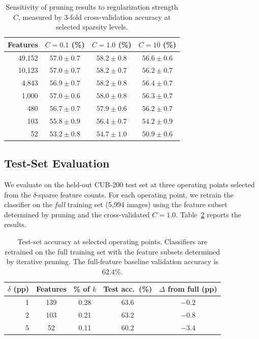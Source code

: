 \begin{table}[t]
\centering
\caption{Sensitivity of pruning results to regularization strength $C$, measured by 3-fold cross-validation accuracy at selected sparsity levels.}
\label{tab:sensitivity}
\begin{tabular}{r ccc}
\toprule
Features & $C = 0.1$ (\%) & $C = 1.0$ (\%) & $C = 10$ (\%) \\
\midrule
49{,}152 & $57.0 \pm 0.7$ & $\mathbf{58.2 \pm 0.8}$ & $56.6 \pm 0.6$ \\
10{,}123 & $57.0 \pm 0.7$ & $\mathbf{58.2 \pm 0.7}$ & $56.2 \pm 0.7$ \\
4{,}843  & $56.9 \pm 0.7$ & $\mathbf{58.2 \pm 0.8}$ & $56.4 \pm 0.7$ \\
1{,}000  & $57.0 \pm 0.6$ & $\mathbf{58.0 \pm 0.8}$ & $56.3 \pm 0.7$ \\
480      & $56.7 \pm 0.7$ & $\mathbf{57.9 \pm 0.6}$ & $56.2 \pm 0.7$ \\
103      & $55.8 \pm 0.9$ & $\mathbf{56.4 \pm 0.7}$ & $54.2 \pm 0.9$ \\
52       & $53.2 \pm 0.8$ & $\mathbf{54.7 \pm 1.0}$ & $50.9 \pm 0.6$ \\
\bottomrule
\end{tabular}
\end{table}

\subsection{Test-Set Evaluation}
\label{sec:test_results}

We evaluate on the held-out CUB-200 test set at three operating points selected from the $\delta$-sparse feature counts. For each operating point, we retrain the classifier on the \emph{full} training set (5{,}994 images) using the feature subset determined by pruning and the cross-validated $C = 1.0$. Table~\ref{tab:test} reports the results.

\begin{table}[t]
\centering
\caption{Test-set accuracy at selected operating points. Classifiers are retrained on the full training set with the feature subsets determined by iterative pruning. The full-feature baseline validation accuracy is 62.4\%.}
\label{tab:test}
\begin{tabular}{rcccc}
\toprule
$\delta$ (pp) & Features & \% of $k$ & Test acc.\ (\%) & $\Delta$ from full (pp) \\
\midrule
1 & 139 & 0.28 & 63.6 & $-0.2$ \\
2 & 103 & 0.21 & 63.2 & $-0.8$ \\
5 &  52 & 0.11 & 60.2 & $-3.4$ \\
\bottomrule
\end{tabular}
\end{table}

